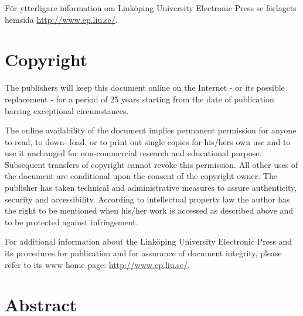 \documentclass[11pt]{scrartcl}
\begin{document}
För ytterligare information om Linköping University Electronic Press se förlagets hemsida \url{http://www.ep.liu.se/}.

\vspace*{\fill}

\section*{Copyright}

The publishers will keep this document online on the Internet - or its possible replacement - for a period of 25 years starting from the date of publication barring exceptional circumstances.

The online availability of the document implies permanent permission for anyone to read, to down- load, or to print out single copies for his/hers own use and to use it unchanged for non-commercial research and educational purpose. Subsequent transfers of copyright cannot revoke this permission. All other uses of the document are conditional upon the consent of the copyright owner. The publisher has taken technical and administrative measures to assure authenticity, security and accessibility. According to intellectual property law the author has the right to be mentioned when his/her work is accessed as described above and to be protected against infringement.

For additional information about the Linköping University Electronic Press and its procedures for publication and for assurance of document integrity, please refer to its www home page: \url{http://www.ep.liu.se/}.

\vspace*{\fill}

\clearpage

\section*{Abstract}
\end{document}
